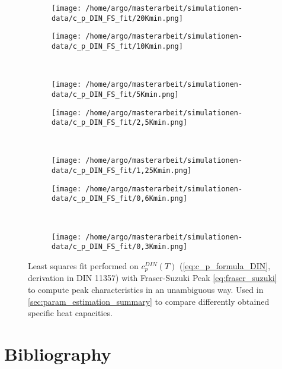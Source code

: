 \documentclass{scrartcl}[12pt, halfparskip]
\numberwithin{equation}{section}
\numberwithin{figure}{section}
\numberwithin{table}{section}
\begin{document}
\begin{figure}[H]
	\begin{subfigure}{0.49\textwidth}
		\texttt{[image: /home/argo/masterarbeit/simulationen-data/c\_p\_DIN\_FS\_fit/20Kmin.png]}
	\end{subfigure}
	\begin{subfigure}{0.49\textwidth}
		\texttt{[image: /home/argo/masterarbeit/simulationen-data/c\_p\_DIN\_FS\_fit/10Kmin.png]}
	\end{subfigure} \\[1ex]
	\begin{subfigure}{0.49\textwidth}
		\texttt{[image: /home/argo/masterarbeit/simulationen-data/c\_p\_DIN\_FS\_fit/5Kmin.png]}
	\end{subfigure}
	\begin{subfigure}{0.49\textwidth}
		\texttt{[image: /home/argo/masterarbeit/simulationen-data/c\_p\_DIN\_FS\_fit/2,5Kmin.png]}
	\end{subfigure} \\[1ex]
	\begin{subfigure}{0.49\textwidth}
		\texttt{[image: /home/argo/masterarbeit/simulationen-data/c\_p\_DIN\_FS\_fit/1,25Kmin.png]}
	\end{subfigure}
	\begin{subfigure}{0.49\textwidth}
		\texttt{[image: /home/argo/masterarbeit/simulationen-data/c\_p\_DIN\_FS\_fit/0,6Kmin.png]}
	\end{subfigure} \\[1ex]
	\centering
	\begin{subfigure}{0.49\textwidth}
		\texttt{[image: /home/argo/masterarbeit/simulationen-data/c\_p\_DIN\_FS\_fit/0,3Kmin.png]}
	\end{subfigure}
	\caption{Least squares fit performed on $c_p^{DIN}(T)$ (\cref{eq:c_p_formula_DIN}, derivation in DIN 11357) with Fraser-Suzuki Peak \cref{eq:fraser_suzuki} to compute peak characteristics in an unambiguous way. Used in \cref{sec:param_estimation_summary} to compare differently obtained specific heat capacities.}
	\label{fig:FS_DIN_fits}
\end{figure}

\newpage
\section{Bibliography}
\end{document}

